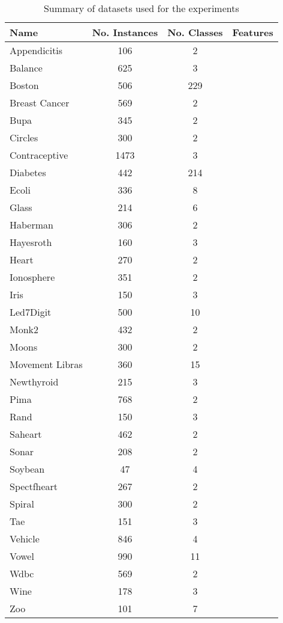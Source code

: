 \documentclass[review]{elsarticle}
\begin{document}
\begin{table}[!h]
	\centering
	\small
	\begin{tabular}{l c c c}
		\hline
		Name & No. Instances & No. Classes & Features \\
		\hline
		Appendicitis & 106 & 2 &  \\
		Balance & 625 & 3 &  \\
		Boston & 506 & 229 &  \\
		Breast Cancer & 569 & 2 &  \\
		Bupa & 345 & 2 &  \\
		Circles & 300 & 2 &  \\
		Contraceptive & 1473 & 3 &  \\
		Diabetes & 442 & 214 &  \\
		Ecoli & 336 & 8 &  \\
		Glass & 214 & 6 &  \\
		Haberman & 306 & 2 &  \\
		Hayesroth & 160 & 3 &  \\
		Heart & 270 & 2 &  \\
		Ionosphere & 351 & 2 &  \\
		Iris & 150 & 3 &  \\
		Led7Digit & 500 & 10 &  \\
		Monk2 & 432 & 2 &  \\
		Moons & 300 & 2 &  \\
		Movement Libras & 360 & 15 &  \\
		Newthyroid & 215 & 3 &  \\
		Pima & 768 & 2 &  \\
		Rand & 150 & 3 &  \\
		Saheart & 462 & 2 &  \\
		Sonar & 208 & 2 &  \\
		Soybean & 47 & 4 &  \\
		Spectfheart & 267 & 2 &  \\
		Spiral & 300 & 2 &  \\
		Tae & 151 & 3 &  \\
		Vehicle & 846 & 4 &  \\
		Vowel & 990 & 11 &  \\
		Wdbc & 569 & 2 &  \\
		Wine & 178 & 3 &  \\
		Zoo & 101 & 7 &  \\
		\hline

	\end{tabular}%
	\caption{Summary of datasets used for the experiments \cite{triguero2017keel}\cite{scikit-learn}}
	\label{tab:datasets}
\end{table}
\end{document}

